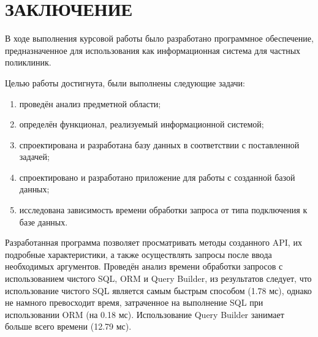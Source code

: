 \section*{\large ЗАКЛЮЧЕНИЕ}

В  ходе  выполнения  курсовой работы  было  разработано  программное обеспечение, предназначенное для использования как информационная система для частных поликлиник.

Целью работы достигнута, были выполнены следующие задачи:
\begin{enumerate}[label=\arabic*)]
	\item проведён анализ предметной области;
	\item определён функционал, реализуемый информационной системой;
	\item спроектирована и разработана базу данных в соответствии с поставленной задачей;
	\item спроектировано и разработано приложение для работы с созданной базой данных;
	\item исследована зависимость времени обработки запроса от типа подключения к базе данных.
\end{enumerate}

Разработанная программа позволяет просматривать методы созданного API, их подробные характеристики, а также осуществлять запросы после ввода необходимых аргументов.
Проведён анализ времени обработки запросов с использованием чистого SQL, ORM и Query Builder, из результатов следует, что использование чистого SQL является самым быстрым способом (1.78 мс), однако не намного превосходит время, затраченное на выполнение SQL при использовании ORM (на 0.18 мс). Использование Query Builder занимает больше всего времени (12.79 мс).


\pagebreak